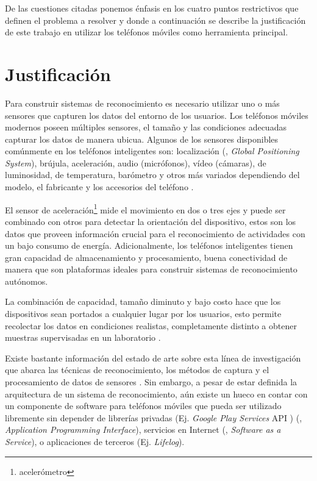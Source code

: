De las cuestiones citadas ponemos énfasis en los cuatro puntos restrictivos
que definen el problema a resolver y donde a continuación se describe
la justificación de este trabajo en utilizar los teléfonos móviles
como herramienta principal.

\section{Justificación}

\label{justificaciuxf3n}

Para construir sistemas de reconocimiento es necesario utilizar uno
o más sensores que capturen los datos del entorno de los usuarios.
Los teléfonos móviles modernos poseen múltiples sensores, el tamaño
y las condiciones adecuadas capturar los datos de manera ubicua. Algunos
de los sensores disponibles comúnmente en los teléfonos inteligentes
son: localización (, \emph{Global Positioning System}),
brújula, aceleración, audio (micrófonos), vídeo (cámaras), de luminosidad,
de temperatura, barómetro y otros más variados dependiendo del modelo,
el fabricante y los accesorios del teléfono \cite{Kwapisz2011}.

El sensor de aceleración\footnote{acelerómetro} mide el movimiento
en dos o tres ejes y puede ser combinado con otros para detectar la
orientación del dispositivo, estos son los datos que proveen información
crucial para el reconocimiento de actividades con un bajo consumo
de energía. Adicionalmente, los teléfonos inteligentes tienen gran
capacidad de almacenamiento y procesamiento, buena conectividad de
manera que son plataformas ideales para construir sistemas de reconocimiento
autónomos.

La combinación de capacidad, tamaño diminuto y bajo costo hace que
los dispositivos sean portados a cualquier lugar por los usuarios,
esto permite recolectar los datos en condiciones realistas, completamente
distinto a obtener muestras supervisadas en un laboratorio \cite{Bao2004}. 

Existe bastante información del estado de arte sobre esta línea de
investigación que abarca las técnicas de reconocimiento, los métodos
de captura y el procesamiento de datos de sensores \cite{LaraLabrador2012,Kwapisz2011}.
Sin embargo, a pesar de estar definida la arquitectura de un sistema
de reconocimiento, aún existe un hueco en contar con un componente
de software para teléfonos móviles que pueda ser utilizado libremente
sin depender de librerías privadas (Ej. \emph{Google Play Services}
API \cite{Google2016l}) (, \emph{Application Programming
Interface}), servicios en Internet (, \emph{Software as
a Service}), o aplicaciones de terceros (Ej. \emph{Lifelog}).

